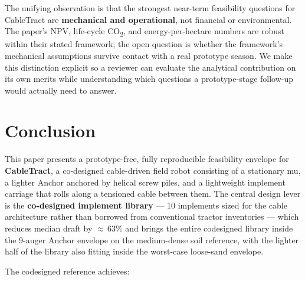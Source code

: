 \documentclass[11pt,a4paper]{article}
\begin{document}
\medskip
The unifying observation is that the strongest near-term feasibility questions for CableTract are \textbf{mechanical and operational}, not financial or environmental. The paper's NPV, life-cycle CO\textsubscript{2}, and energy-per-hectare numbers are robust within their stated framework; the open question is whether the framework's mechanical assumptions survive contact with a real prototype season. We make this distinction explicit so a reviewer can evaluate the analytical contribution on its own merits while understanding which questions a prototype-stage follow-up would actually need to answer.

\section{Conclusion}\label{sec:conclusion}

This paper presents a prototype-free, fully reproducible feasibility envelope for \textbf{CableTract}, a co-designed cable-driven field robot consisting of a stationary \gls{mu}, a lighter Anchor anchored by helical screw piles, and a lightweight implement carriage that rolls along a tensioned cable between them. The central design lever is the \textbf{co-designed implement library} --- 10 implements sized for the cable architecture rather than borrowed from conventional tractor inventories --- which reduces median draft by ${\approx}\,63\%$ and brings the entire codesigned library inside the 9-auger Anchor envelope on the medium-dense soil reference, with the lighter half of the library also fitting inside the worst-case loose-sand envelope.

The codesigned reference achieves:
\end{document}
